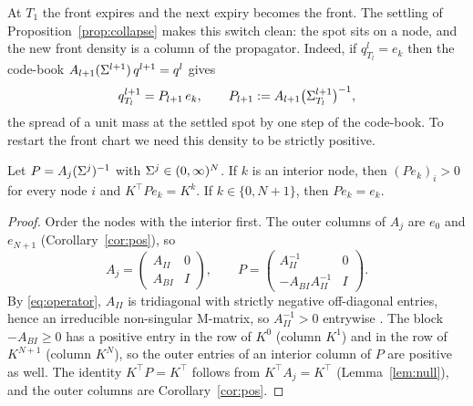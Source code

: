 At $T_1$ the front expires and the next expiry becomes the front. The settling of
Proposition~\ref{prop:collapse} makes this switch clean: the spot sits on a node, and the
new front density is a column of the propagator. Indeed, if $q^l_{T_l}=e_k$ then the
code-book $A_{l+1}(\Sigma^{l+1})\,q^{l+1}=q^l$ gives
\begin{equation}\label{eq:handover}
  q^{l+1}_{T_l}=P_{l+1}\,e_k ,\qquad P_{l+1}:=A_{l+1}\bigl(\Sigma^{l+1}_{T_l}\bigr)^{-1},
\end{equation}
the spread of a unit mass at the settled spot by one step of the code-book. To restart the
front chart we need this density to be strictly positive.

\begin{lemma}\label{lem:newfront}
Let $P=A_j(\Sigma^j)^{-1}$ with $\Sigma^j\in(0,\infty)^N$. If $k$ is an interior node, then
$(Pe_k)_i>0$ for every node $i$ and $K^{\!\top}Pe_k=K^k$. If $k\in\{0,N+1\}$, then
$Pe_k=e_k$.
\end{lemma}

\begin{proof}
Order the nodes with the interior first. The outer columns of $A_j$ are $e_0$ and
$e_{N+1}$ (Corollary~\ref{cor:pos}), so
\[
  A_j=\begin{pmatrix}A_{II}&0\\A_{BI}&I\end{pmatrix},\qquad
  P=\begin{pmatrix}A_{II}^{-1}&0\\-A_{BI}A_{II}^{-1}&I\end{pmatrix}.
\]
By \eqref{eq:operator}, $A_{II}$ is tridiagonal with strictly negative off-diagonal
entries, hence an irreducible non-singular M-matrix, so $A_{II}^{-1}>0$ entrywise
\cite{BermanPlemmons1994}. The block $-A_{BI}\ge0$ has a positive entry in the row of
$K^0$ (column $K^1$) and in the row of $K^{N+1}$ (column $K^N$), so the outer entries of an
interior column of $P$ are positive as well. The identity $K^{\!\top}P=K^{\!\top}$ follows
from $K^{\!\top}A_j=K^{\!\top}$ (Lemma~\ref{lem:null}), and the outer columns are
Corollary~\ref{cor:pos}.
\end{proof}

